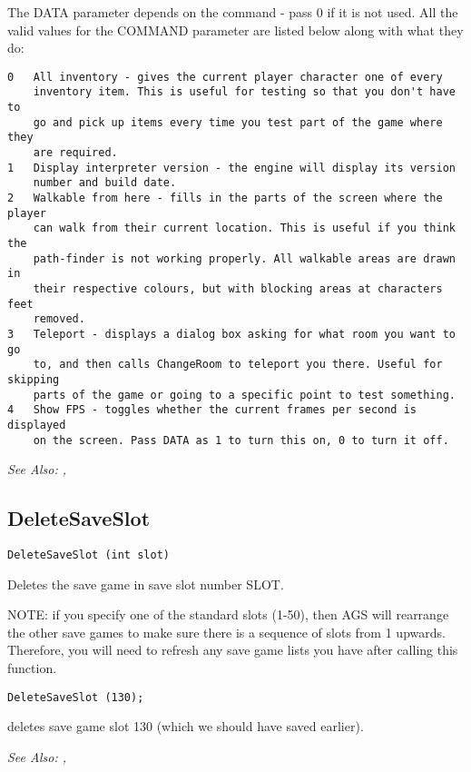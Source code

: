 The DATA parameter depends on the command - pass 0 if it is not used.
All the valid values for the COMMAND parameter are listed below along with
what they do:
\begin{verbatim}
0   All inventory - gives the current player character one of every
    inventory item. This is useful for testing so that you don't have to
    go and pick up items every time you test part of the game where they
    are required.
1   Display interpreter version - the engine will display its version
    number and build date.
2   Walkable from here - fills in the parts of the screen where the player
    can walk from their current location. This is useful if you think the
    path-finder is not working properly. All walkable areas are drawn in
    their respective colours, but with blocking areas at characters feet
    removed.
3   Teleport - displays a dialog box asking for what room you want to go
    to, and then calls ChangeRoom to teleport you there. Useful for skipping
    parts of the game or going to a specific point to test something.
4   Show FPS - toggles whether the current frames per second is displayed
    on the screen. Pass DATA as 1 to turn this on, 0 to turn it off.
\end{verbatim}

\it{See Also:} ,


\subsection{DeleteSaveSlot}\label{DeleteSaveSlot}%

\begin{verbatim}
DeleteSaveSlot (int slot)
\end{verbatim}
Deletes the save game in save slot number SLOT.

NOTE: if you specify one of the standard slots (1-50), then AGS will rearrange the other
save games to make sure there is a sequence of slots from 1 upwards. Therefore, you will
need to refresh any save game lists you have after calling this function.

\begin{verbatim}
DeleteSaveSlot (130);
\end{verbatim}
deletes save game slot 130 (which we should have saved earlier).

\it{See Also:} , 


